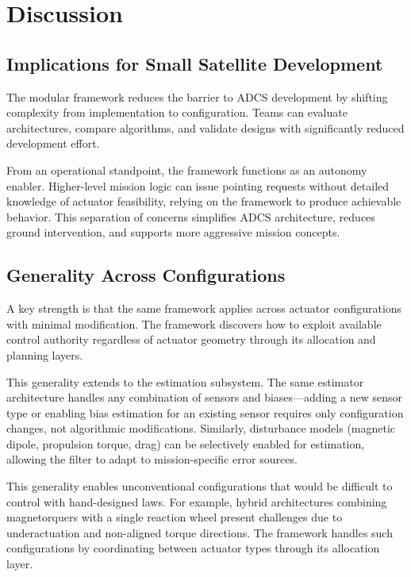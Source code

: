 \documentclass[conference]{IEEEtran}
\begin{document}
\section{Discussion}\label{sec:discussion}

\subsection{Implications for Small Satellite Development}\label{subsec:implications}

The modular framework reduces the barrier to ADCS development by shifting complexity from implementation to configuration. Teams can evaluate architectures, compare algorithms, and validate designs with significantly reduced development effort.

From an operational standpoint, the framework functions as an autonomy enabler. Higher-level mission logic can issue pointing requests without detailed knowledge of actuator feasibility, relying on the framework to produce achievable behavior. This separation of concerns simplifies ADCS architecture, reduces ground intervention, and supports more aggressive mission concepts.

\subsection{Generality Across Configurations}\label{subsec:generality}

A key strength is that the same framework applies across actuator configurations with minimal modification. The framework discovers how to exploit available control authority regardless of actuator geometry through its allocation and planning layers.

This generality extends to the estimation subsystem. The same estimator architecture handles any combination of sensors and biases---adding a new sensor type or enabling bias estimation for an existing sensor requires only configuration changes, not algorithmic modifications. Similarly, disturbance models (magnetic dipole, propulsion torque, drag) can be selectively enabled for estimation, allowing the filter to adapt to mission-specific error sources.

This generality enables unconventional configurations that would be difficult to control with hand-designed laws. For example, hybrid architectures combining magnetorquers with a single reaction wheel present challenges due to underactuation and non-aligned torque directions. The framework handles such configurations by coordinating between actuator types through its allocation layer.
\end{document}
